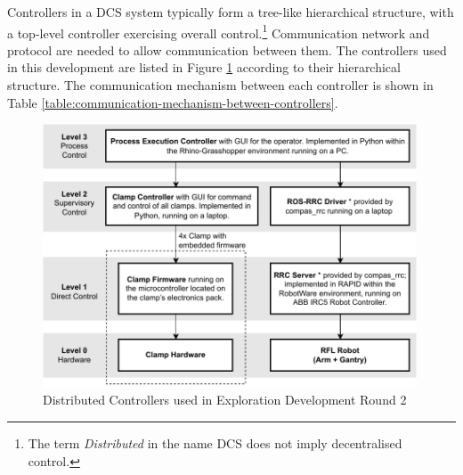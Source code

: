  Controllers in a DCS system typically form a tree-like hierarchical structure, with a top-level controller exercising overall control.\footnote{The term \textit{Distributed} in the name DCS does not imply decentralised control.} Communication network and protocol are needed to allow communication between them. 
The controllers used in this development are listed in Figure \ref{fig:distributed-controllers-used} according to their hierarchical structure. The communication mechanism between each controller is shown in Table \ref{table:communication-mechanism-between-controllers}.

\begin{figure}
    \centering
    \includegraphics[width=0.99\textwidth]{images/05/image38.pdf}
    \caption{Distributed Controllers used in Exploration Development Round 2}
    \label{fig:distributed-controllers-used}
\end{figure}

